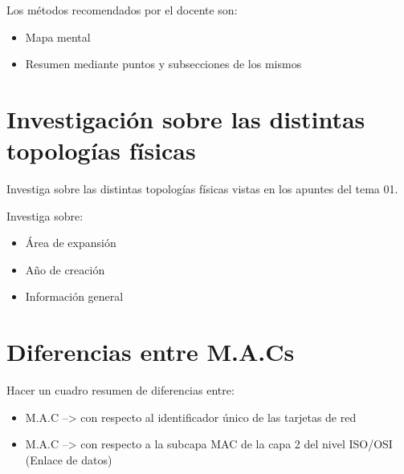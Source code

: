 \documentclass[11pt]{article}
\begin{document}
Los métodos recomendados por el docente son:
\begin{itemize}
\item Mapa mental
\item Resumen mediante puntos y subsecciones de los mismos
\end{itemize}



\section{Investigación sobre las distintas topologías físicas}
\label{sec:orgd5ed89f}
Investiga sobre las distintas topologías físicas vistas en los apuntes del tema 01.

Investiga sobre:
\begin{itemize}
\item Área de expansión
\item Año de creación
\item Información general
\end{itemize}


\section{Diferencias entre M.A.Cs}
\label{sec:org5760274}
Hacer un cuadro resumen de diferencias entre:
\begin{itemize}
\item M.A.C --> con respecto al identificador único de las tarjetas de red
\item M.A.C --> con respecto a la subcapa MAC de la capa 2 del nivel ISO/OSI (Enlace de datos)
\end{itemize}
\end{document}

